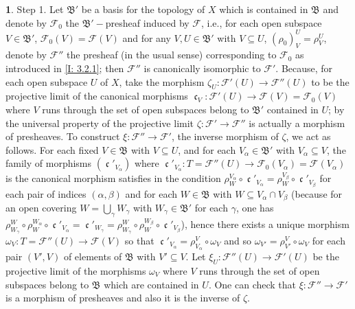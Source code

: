 \documentclass[12pt]{amsart}
\newcommand{\can}{\operatorname{\mathfrak{c}}}
\theoremstyle{definition}
\newtheorem{bk}[proposition]{}
\begin{document}
\begin{bk}
Step 1. Let $\mathfrak{B}'$ be a basis for the topology of $X$ which is contained in $\mathfrak{B}$ and denote by $\mathscr{F}_{0}$ the $\mathfrak{B}'-$presheaf induced by $\mathscr{F}$, i.e., for each open subspace $V\in\mathfrak{B}'$,  $\mathscr{F}_{0}(V)=\mathscr{F}(V)$ and for any $V, U\in\mathfrak{B}'$ with $V\subseteq U$, $(\rho_{0})_{V}^{U}=\rho_{V}^{U}$, denote by $\mathscr{F}''$  the presheaf (in the usual sense) corresponding to $\mathscr{F}_{0}$ as introduced in \ref{I: 3.2.1}; then $\mathscr{F}''$ is canonically isomorphic to $\mathscr{F}'$. Because, for each open subspace $U$ of $X$, take the morphism $\zeta_{U}:\mathscr{F}'(U)\rightarrow\mathscr{F}''(U)$ to be the projective limit of the canonical morphisms $\can_{V}: \mathscr{F}'(U)\rightarrow\mathscr{F}(V)=\mathscr{F}_{0}(V)$ where $V$ runs through the set of open subspaces belong to $\mathfrak{B}'$ contained in $U$; by the universal property of the projective limit $\zeta:\mathscr{F}'\rightarrow\mathscr{F}''$ is actually a morphism of presheaves. To construct $\xi:\mathscr{F}''\rightarrow\mathscr{F}'$, the inverse morphism of $\zeta$, we act as follows. For each fixed $V\in\mathfrak{B}$ with $V\subseteq U$, and for each $V_{\alpha}\in\mathfrak{B}'$ with $V_{\alpha}\subseteq V$, the family of morphisms $(\can'_{V_{\alpha}})$ where $\can'_{V_{\alpha}}: T=\mathscr{F}''(U)\rightarrow\mathscr{F}_{0}(V_{\alpha})
=\mathscr{F}(V_{\alpha})$ is the canonical morphism satisfies in the condition $\rho_{W}^{V_{\alpha}}\circ\can'_{V_{\alpha}}
=\rho_{W}^{V_{\beta}}\circ\can'_{V_{\beta}}$ for each pair of indices $(\alpha, \beta)$ and for each $W\in\mathfrak{B}$ with $W\subseteq V_{\alpha}\cap V_{\beta}$ (because for an open covering  $W=\bigcup\limits_{\gamma}W_{\gamma}$ with $W_{\gamma}\in\mathfrak{B}'$ for each $\gamma$, one has $\rho_{W_{\gamma}}^{W}\circ\rho_{W}^{W_{\alpha}}\circ
\can'_{V_{\alpha}}=\can'_{W_{\gamma}}=\rho_{W_{\gamma}}^{W}
\circ\rho_{W}^{W_{\beta}}\circ\can'_{V_{\beta}}$),
hence there exists a unique morphism $\omega_{V}: T=\mathscr{F}''(U)\rightarrow\mathscr{F}(V)$ so that $\can'_{V_{\alpha}}=\rho_{V_{\alpha}}^{V}\circ\omega_{V}$ and so $\omega_{V'}=\rho_{V'}^{V}\circ\omega_{V}$ for each pair $(V', V)$ of elements of $\mathfrak{B}$ with $V'\subseteq V$. Let $\xi_{U}:\mathscr{F}''(U)\rightarrow\mathscr{F}'(U)$ be the projective limit of the morphisms $\omega_{V}$ where $V$ runs through the set of open subspaces belong to $\mathfrak{B}$ which are contained in $U$. One can check that $\xi:\mathscr{F}''\rightarrow\mathscr{F}'$ is a morphism of presheaves and also it is the inverse of $\zeta$.


\end{bk}
\end{document}
